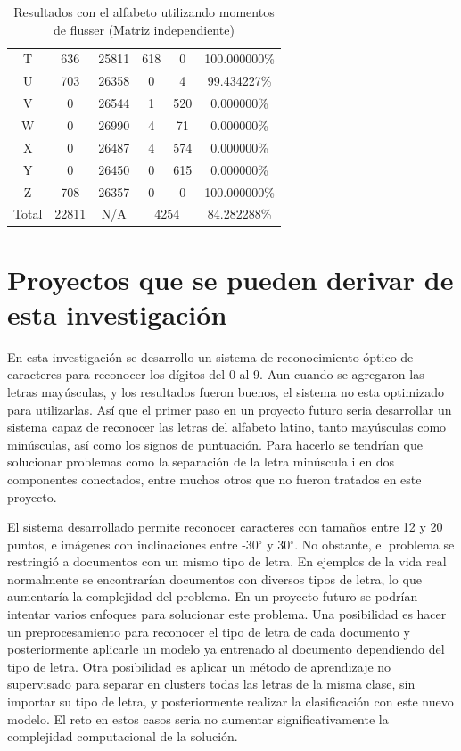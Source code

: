 \documentclass[a4paper, 11pt, oneside]{report}
\begin{document}
\begin{table}
\begin{tabular}{|c|c|c|c|c|c|}
	T & 636 & 25811 & 618 & 0 & 100.000000\% \\ 
	U & 703 & 26358 & 0 & 4 & 99.434227\% \\ 
	V & 0 & 26544 & 1 & 520 & 0.000000\% \\ 
	W & 0 & 26990 & 4 & 71 & 0.000000\% \\ 
	X & 0 & 26487 & 4 & 574 & 0.000000\% \\ 
	Y & 0 & 26450 & 0 & 615 & 0.000000\% \\ 
	Z & 708 & 26357 & 0 & 0 & 100.000000\% \\ 
	\hline
	Total & 22811 & N/A & \multicolumn{2}{|c|}{4254} & 84.282288\% \\
	\hline
\end{tabular}
\caption{Resultados con el alfabeto utilizando momentos de flusser (Matriz independiente)}
\label{tb:alphaRotIndep}
\end{table}

\section{Proyectos que se pueden derivar de esta investigación}


En esta investigación se desarrollo un sistema de reconocimiento óptico de caracteres para reconocer los dígitos del 0 al 9. Aun cuando se agregaron las letras mayúsculas, y los resultados fueron buenos, el sistema no esta optimizado para utilizarlas. Así que el primer paso en un proyecto futuro seria desarrollar un sistema capaz de reconocer las letras del alfabeto latino, tanto mayúsculas como minúsculas, así como los signos de puntuación. Para hacerlo se tendrían que solucionar problemas como la separación de la letra minúscula i en dos componentes conectados, entre muchos otros que no fueron tratados en este proyecto.

El sistema desarrollado permite reconocer caracteres con tamaños entre 12 y 20 puntos, e imágenes con inclinaciones entre -30$^{\circ}$ y 30$^{\circ}$. No obstante, el problema se restringió a documentos con un mismo tipo de letra. En ejemplos de la vida real normalmente se encontrarían documentos con diversos tipos de letra, lo que aumentaría la complejidad del problema. En un proyecto futuro se podrían intentar varios enfoques para solucionar este problema. Una posibilidad es hacer un preprocesamiento para reconocer el tipo de letra de cada documento y posteriormente aplicarle un modelo ya entrenado al documento dependiendo del tipo de letra. Otra posibilidad es aplicar un método de aprendizaje no supervisado para separar en clusters todas las letras de la misma clase, sin importar su tipo de letra, y posteriormente realizar la clasificación con este nuevo modelo. El reto en estos casos seria no aumentar significativamente la complejidad computacional de la solución.
\end{document}
